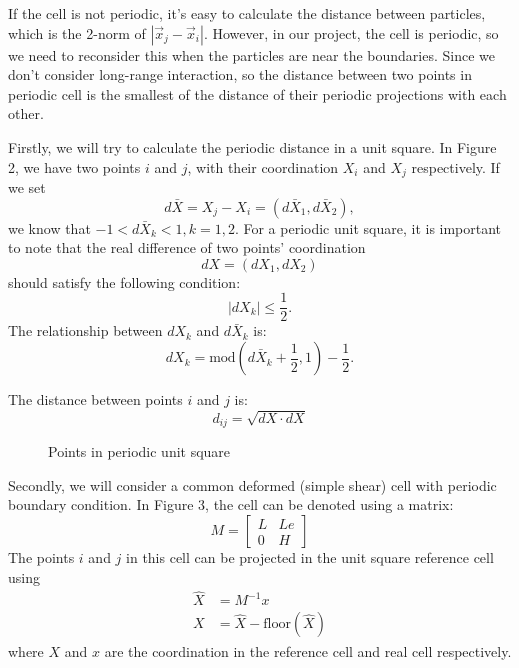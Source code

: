 \documentclass[a4paper]{article}
\begin{document}
If the cell is not periodic, it's easy to calculate the distance between particles, which is the 2-norm of $\left|\vec{x}_{j}-\vec{x}_{i}\right|$. However, in our project, the cell is periodic, so we need to reconsider this when the particles are near the boundaries. Since we don't consider long-range interaction, so the distance between two points in periodic cell is the smallest of the distance of their periodic projections with each other.

Firstly, we will try to calculate the periodic distance in a unit square. In Figure 2, we have two points $i$ and $j$, with their coordination $X_i$ and $X_j$ respectively. If we set
\begin{equation}\label{eq: unit point difference1}
d\bar{X} = X_{j}-X_{i}=(d\bar{X}_{1},d\bar{X}_{2}), 
\end{equation}
we know that $-1<d\bar{X}_{k}<1, k=1,2$. For a periodic unit square, it is important to note that the real difference of two points' coordination 
$$
dX=(dX_{1},dX_{2})
$$ 
should satisfy the following condition:
$$
\left|dX_{k}\right|\le\frac{1}{2}.
$$
The relationship between $dX_{k}$ and $d\bar{X}_{k}$ is:
\begin{equation}\label{eq: unit point difference2}
dX_{k} = \text{mod}(d\bar{X}_{k} + \frac{1}{2}, 1) - \frac{1}{2}.
\end{equation}

The distance between points $i$ and $j$ is:
\begin{equation}
d_{ij}=\sqrt{dX \cdot dX}
\end{equation}

\begin{figure}[!htbp]
\begin{center}
\end{center}
\caption{Points in periodic unit square}
\end{figure}

Secondly, we will consider a common deformed (simple shear) cell with periodic boundary condition. In Figure 3, the cell can be denoted using a matrix:
$$
M=
\begin{bmatrix}
L & Le\\
0 & H
\end{bmatrix}
$$
The points $i$ and $j$ in this cell can be projected in the unit square reference cell using
\begin{subequations}\label{eq: tranform x2X}
\begin{align}
\hat{X}&=M^{-1}x \\
X&=\hat{X} - \text{floor}(\hat{X})
\end{align}
\end{subequations}
where $X$ and $x$ are the coordination in the reference cell and real cell respectively. 
\end{document}
